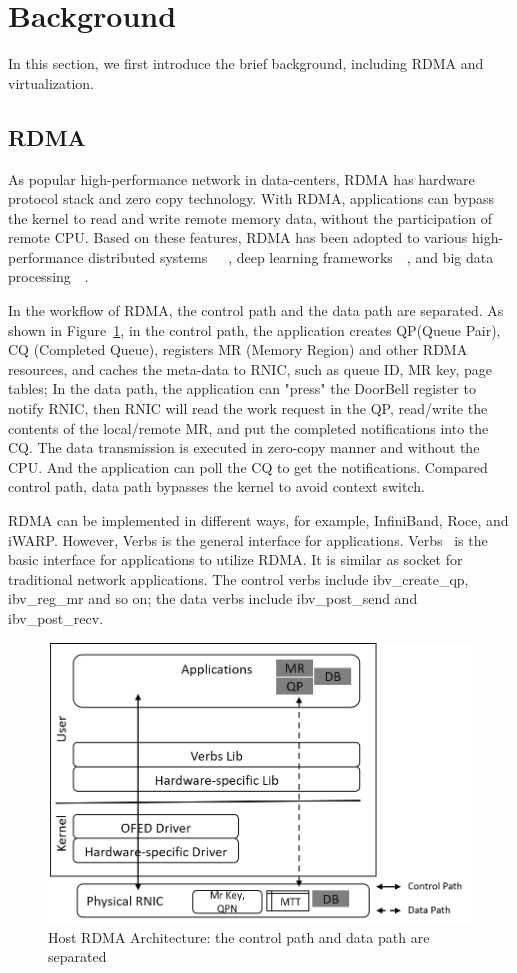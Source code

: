 \section{Background}
In this section, we first introduce the brief background, including RDMA and virtualization. 

\subsection{RDMA}
As popular high-performance network in data-centers, RDMA has hardware protocol stack and zero copy technology. With RDMA, applications can bypass the kernel to read and write remote memory data, without the participation of remote CPU. Based on these features, RDMA has been adopted to various high-performance distributed systems~\cite{dragojevic2014farm}~\cite{wei2015fast}~\cite{lu2017octopus}, deep learning frameworks~\cite{abadi2016tensorflow}~\cite{chen2015mxnet}, and big data processing~\cite{spark-rdma}~\cite{hadoop-rdma}.   


In the workflow of RDMA, the control path and the data path are separated. As shown in Figure~\ref{fig:rdma-feat}, in the control path, the application creates QP(Queue Pair), CQ (Completed Queue), registers MR (Memory Region) and other RDMA resources, and caches the meta-data to RNIC, such as queue ID, MR key, page tables; In the data path, the application can "press"  the DoorBell register to notify RNIC, then RNIC will read the work request in the QP, read/write the contents of the local/remote MR, and put the completed notifications into the CQ. The data transmission is executed in zero-copy manner and without the CPU. And the application can poll the CQ to get the notifications. Compared control path, data path bypasses the kernel to avoid context switch.

RDMA can be implemented in different ways, for example, InfiniBand, Roce, and iWARP. However, Verbs is the general interface for applications. Verbs~\cite{verbs} is the basic interface for applications to utilize RDMA. It is similar as socket for traditional network applications. The control verbs include ibv\_create\_qp, ibv\_reg\_mr and so on; the data verbs include ibv\_post\_send and ibv\_post\_recv. 


\begin{figure}[!ht]
\centering
\includegraphics[width=0.8\linewidth]{images/rdma-feat.png}
\caption{Host RDMA Architecture: the control path and data path are separated}
\label{fig:rdma-feat}
\end{figure}


